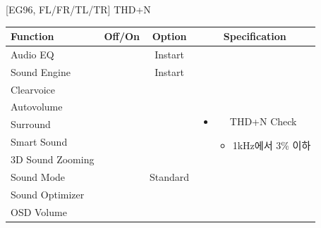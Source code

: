 \documentclass{beamer}
\begin{document}
\begin{frame}[t]{[EG96, FL/FR/TL/TR] THD+N}
\begin{tiny}
\begin{tabular}{@{}lccc@{}}
\toprule
Function & Off/On & Option & Specification \\
\midrule
Audio EQ & \color{black}{Off} & Instart &
\multirow{10}{60mm}{
\begin{itemize}
\item THD+N Check
	\begin{itemize}
	\item 1kHz에서 3\% 이하
	\end{itemize}
\end{itemize}
} \\
Sound Engine & \color{black}{Off} & Instart & \\
Clearvoice & \color{black}{Off} & & \\
Autovolume & \color{black}{Off} & & \\
Surround & \color{black}{Off} & & \\
Smart Sound & \color{black}{Off} & & \\
3D Sound Zooming & \color{black}{Off} & & \\
Sound Mode & \color{blue}{On} & Standard & \\
Sound Optimizer & \color{black}{Off} & & \\
OSD Volume & \color{blue}{On} & \color{blue}{Vol.100} & \\
\midrule
\end{tabular}
\end{tiny}

\end{frame}
\end{document}
